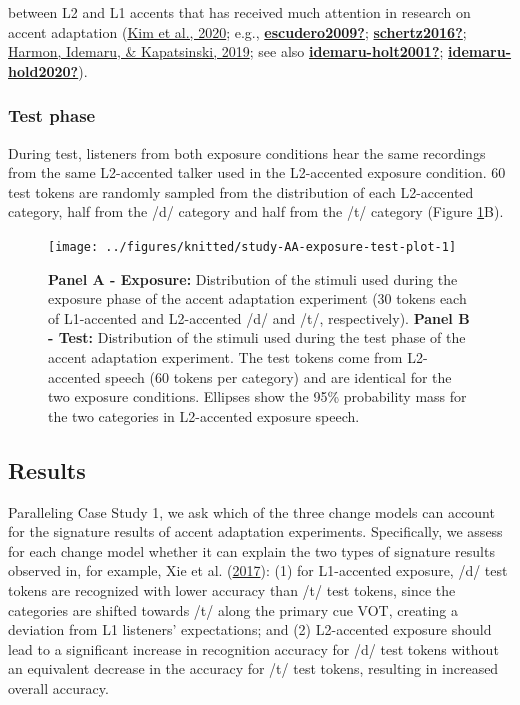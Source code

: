 \documentclass[
  11pt,
  english,
  man,floatsintext]{apa6}
\begin{document}
between L2 and L1 accents that has received much attention in research on accent adaptation (\protect\hyperlink{ref-kim2020}{Kim et al., 2020}; e.g., \protect\hyperlink{ref-escudero2009}{\textbf{escudero2009?}}; \protect\hyperlink{ref-schertz2016}{\textbf{schertz2016?}}; \protect\hyperlink{ref-harmon2019}{Harmon, Idemaru, \& Kapatsinski, 2019}; see also \protect\hyperlink{ref-idemaru-holt2001}{\textbf{idemaru-holt2001?}}; \protect\hyperlink{ref-idemaru-hold2020}{\textbf{idemaru-hold2020?}}).

\hypertarget{test-phase-1}{%
\subsubsection{Test phase}\label{test-phase-1}}

During test, listeners from both exposure conditions hear the same recordings from the same L2-accented talker used in the L2-accented exposure condition. 60 test tokens are randomly sampled from the distribution of each L2-accented category, half from the /d/ category and half from the /t/ category (Figure \ref{fig:study-AA-exposure-test-plot}B).



\begin{figure}

{\centering \texttt{[image: ../figures/knitted/study-AA-exposure-test-plot-1]} 

}

\caption{\textbf{Panel A - Exposure:} Distribution of the stimuli used during the exposure phase of the accent adaptation experiment (30 tokens each of L1-accented and L2-accented /d/ and /t/, respectively). \textbf{Panel B - Test:} Distribution of the stimuli used during the test phase of the accent adaptation experiment. The test tokens come from L2-accented speech (60 tokens per category) and are identical for the two exposure conditions. Ellipses show the 95\% probability mass for the two categories in L2-accented exposure speech.}\label{fig:study-AA-exposure-test-plot}
\end{figure}

\hypertarget{results-1}{%
\subsection{Results}\label{results-1}}

Paralleling Case Study 1, we ask which of the three change models can account for the signature results of accent adaptation experiments. Specifically, we assess for each change model whether it can explain the two types of signature results observed in, for example, Xie et al. (\protect\hyperlink{ref-xie2016jep}{2017}): (1) for L1-accented exposure, /d/ test tokens are recognized with lower accuracy than /t/ test tokens, since the categories are shifted towards /t/ along the primary cue VOT, creating a deviation from L1 listeners' expectations; and (2) L2-accented exposure should lead to a significant increase in recognition accuracy for /d/ test tokens without an equivalent decrease in the accuracy for /t/ test tokens, resulting in increased overall accuracy.
\end{document}
